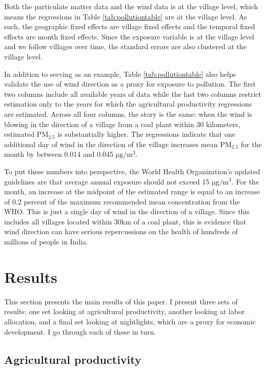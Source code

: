 \documentclass[
]{article}
\begin{document}
Both the particulate matter data and the wind data is at the village level, which means the regressions in Table \ref{tab:pollutiontable} are at the village level. As such, the geographic fixed effects are village fixed effects and the temporal fixed effects are month fixed effects. Since the exposure variable is at the village level and we follow villages over time, the standard errors are also clustered at the village level.

In addition to serving as an example, Table \ref{tab:pollutiontable} also helps validate the use of wind direction as a proxy for exposure to pollution. The first two columns include all available years of data while the last two columns restrict estimation only to the years for which the agricultural productivity regressions are estimated. Across all four columns, the story is the same: when the wind is blowing in the direction of a village from a coal plant within 30 kilometers, estimated \(\mathrm{PM_{2.5}}\) is substantially higher. The regressions indicate that one additional day of wind in the direction of the village increases mean \(\mathrm{PM_{2.5}}\) for the month by between 0.014 and 0.045 \(\mathrm{\mu g/m^3}\).

To put these numbers into perspective, the World Health Organization's updated guidelines are that average annual exposure should not exceed 15 \(\mathrm{\mu g/m^3}\). For the month, an increase at the midpoint of the estimated range is equal to an increase of 0.2 percent of the maximum recommended mean concentration from the WHO. This is just a single day of wind in the direction of a village. Since this includes all villages located within 30km of a coal plant, this is evidence that wind direction can have serious repercussions on the health of hundreds of millions of people in India.

\hypertarget{results}{%
\section{\texorpdfstring{Results \label{results}}{Results }}\label{results}}

This section presents the main results of this paper. I present three sets of results: one set looking at agricultural productivity, another looking at labor allocation, and a final set looking at nightlights, which are a proxy for economic development. I go through each of these in turn.

\hypertarget{agricultural-productivity}{%
\subsection{Agricultural productivity}\label{agricultural-productivity}}
\end{document}
